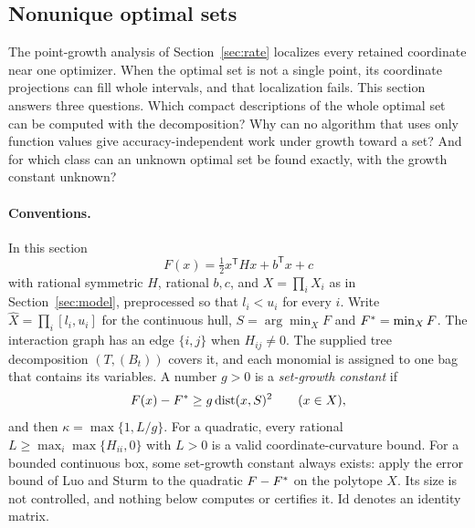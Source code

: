 
\subsection{Nonunique optimal sets}\label{sec:optsets}

The point-growth analysis of Section~\ref{sec:rate} localizes every retained
coordinate near one optimizer. When the optimal set is not a single point,
its coordinate projections can fill whole intervals, and that localization
fails. This section answers three questions. Which compact descriptions of
the whole optimal set can be computed with the decomposition? Why can no
algorithm that uses only function values give accuracy-independent work under
growth toward a set? And for which class can an unknown optimal set be found
exactly, with the growth constant unknown?

\paragraph{Conventions.}
In this section
\[
F(x)=\tfrac12x^{\mathsf T}Hx+b^{\mathsf T}x+c
\]
with rational symmetric $H$, rational $b,c$, and $X=\prod_iX_i$ as in
Section~\ref{sec:model}, preprocessed so that $l_i<u_i$ for every $i$. Write
$\hat X=\prod_i[l_i,u_i]$ for the continuous hull, $S=\arg\min_XF$ and
$F^*=\min_XF$. The interaction graph has an edge $\{i,j\}$ when $H_{ij}\ne0$.
The supplied tree decomposition $(T,(B_t))$ covers it, and each monomial is
assigned to one bag that contains its variables. A number $g>0$ is a
\emph{set-growth constant} if
\begin{equation}\label{eq:setgrowth}
F(x)-F^*\ge g\operatorname{dist}(x,S)^2\qquad(x\in X),
\end{equation}
and then $\kappa=\max\{1,L/g\}$. For a quadratic, every rational
$L\ge\max_i\max\{H_{ii},0\}$ with $L>0$ is a valid coordinate-curvature bound.
For a bounded continuous box, some set-growth constant always exists: apply
the error bound of Luo and Sturm \cite[Theorem~3.3]{LuoSturm2000} to the
quadratic $F-F^*$ on the polytope $X$. Its size is not controlled, and
nothing below computes or certifies it. $\mathrm{Id}$ denotes an identity
matrix.

